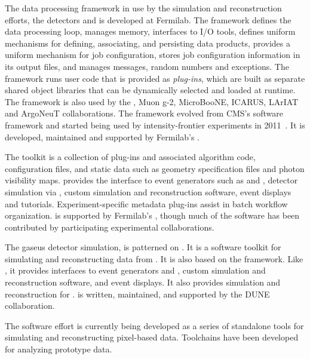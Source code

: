 \documentclass[../main-v1.tex]{subfiles}
\begin{document}
The data processing framework in use by the  simulation and reconstruction efforts, the  detectors and  is  developed at Fermilab.  The  framework defines the data processing loop, manages memory, interfaces to I/O tools, defines uniform mechanisms for defining, associating, and persisting data products, provides a uniform mechanism for job configuration, stores job configuration information in its output files, and manages messages, random numbers and exceptions.  The  framework runs user code that is provided as {\it plug-ins}, which are built as separate shared object libraries that can be dynamically selected and loaded at runtime.  The  framework is also used by the , Muon g-2, MicroBooNE, ICARUS, LArIAT and ArgoNeuT collaborations.  The  framework evolved from CMS's software framework and started being used by intensity-frontier experiments in 2011~\cite{Green:2012gv}. It is developed, maintained and supported by Fermilab's .

The  toolkit is a collection of  plug-ins and associated algorithm code, configuration files, and static data such as geometry specification files and photon visibility maps.   provides the interface to event generators such as  and , detector simulation via , custom simulation and reconstruction software, event displays and tutorials.  Experiment-specific metadata plug-ins assist in batch workflow organization.   is supported by Fermilab's , though much of the software has been contributed by participating experimental collaborations.


The gaseus detector simulation,  is patterned on .  It is a software toolkit for simulating and reconstructing data from .  It is also based on the  framework.  Like , it provides interfaces to event generators and , custom simulation and reconstruction software, and event displays.  It also provides simulation and reconstruction for .   is written, maintained, and supported by the DUNE collaboration.

The  software effort is currently being developed as a series of standalone tools for simulating and reconstructing pixel-based  data.  Toolchains have been developed for analyzing  prototype data.
\end{document}

